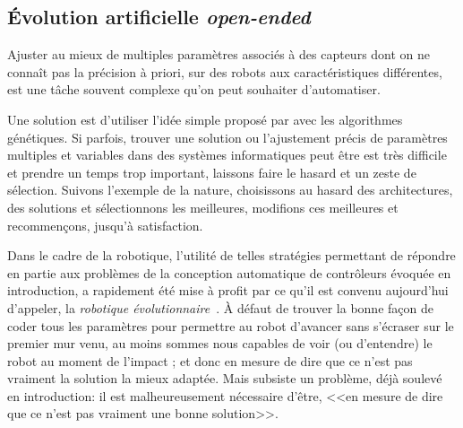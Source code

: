 \documentclass[a4paper,10pt]{report}
\begin{document}


\subsection{\'{E}volution artificielle \emph{open-ended}}

\label{sec:oee}
Ajuster au mieux de multiples paramètres associés à des capteurs dont on ne connaît pas la précision à priori, sur des robots aux caractéristiques différentes, est une tâche souvent complexe qu'on peut souhaiter d'automatiser. 

Une solution est d'utiliser l'idée simple proposé par \cite{holland1975adapnatuartisystintrappltobiolcontartiinte} avec les algorithmes génétiques. Si parfois, trouver une solution ou l'ajustement précis de paramètres multiples et variables dans des systèmes informatiques peut être est très difficile et prendre un temps trop important, laissons faire le hasard et un zeste de sélection. Suivons l'exemple de la nature, choisissons au hasard des architectures, des solutions et sélectionnons les meilleures, modifions ces meilleures et recommen\c cons, jusqu'à satisfaction. 




Dans le cadre de la robotique, l'utilité de telles stratégies permettant de répondre en partie aux problèmes de la conception automatique de contrôleurs évoquée en introduction, a rapidement été mise à profit par ce qu'il est convenu aujourd'hui d'appeler, la \emph{robotique évolutionnaire}~\citep{nolfi00evolrobobiolintetechselfmach}.
À défaut de trouver la bonne fa\c con de coder tous les paramètres pour permettre au robot d'avancer sans s'écraser sur le premier mur venu, au moins sommes nous capables de voir (ou d'entendre) le robot au moment de l'impact ; et donc en mesure de dire que ce n'est pas vraiment la solution la mieux adaptée.  Mais subsiste un problème, déjà soulevé en introduction: il est malheureusement nécessaire d'être, <<en mesure de dire que ce n'est pas vraiment une bonne solution>>.
\end{document}
